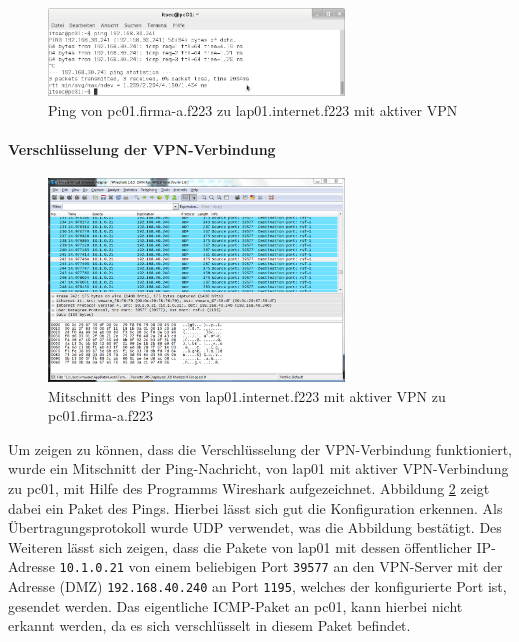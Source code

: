 \begin{figure}[h!]
  \centering
    \includegraphics[width=0.7\textwidth]{figures/vpn_pc01_ping_lap01.png}
  \caption{Ping von pc01.firma-a.f223 zu lap01.internet.f223 mit aktiver VPN}
  \label{vpn:pc01-ping-lap01}
\end{figure}

\paragraph{Verschlüsselung der VPN-Verbindung}

\begin{figure}[h!]
  \centering
    \includegraphics[width=0.7\textwidth]{figures/vpn_ws_lap01_ping_pc01.png}
  \caption{Mitschnitt des Pings von lap01.internet.f223 mit aktiver VPN zu pc01.firma-a.f223}
  \label{vpn:ws_lap01-ping-pc01}
\end{figure}


Um zeigen zu können, dass die Verschlüsselung der VPN-Verbindung funktioniert, wurde ein Mitschnitt der Ping-Nachricht, von lap01 mit aktiver VPN-Verbindung zu pc01, mit Hilfe des Programms Wireshark aufgezeichnet.
Abbildung \ref{vpn:ws_lap01-ping-pc01} zeigt dabei ein Paket des Pings. Hierbei lässt sich gut die Konfiguration erkennen. Als Übertragungsprotokoll wurde UDP verwendet, was die Abbildung bestätigt. Des Weiteren lässt sich zeigen, dass die Pakete von lap01 mit dessen öffentlicher IP-Adresse \texttt{10.1.0.21} von einem beliebigen Port \texttt{39577} an den VPN-Server mit der Adresse (DMZ) \texttt{192.168.40.240} an Port \texttt{1195}, welches der konfigurierte Port ist, gesendet werden. Das eigentliche ICMP-Paket an pc01, kann hierbei nicht erkannt werden, da es sich verschlüsselt in diesem Paket befindet.

